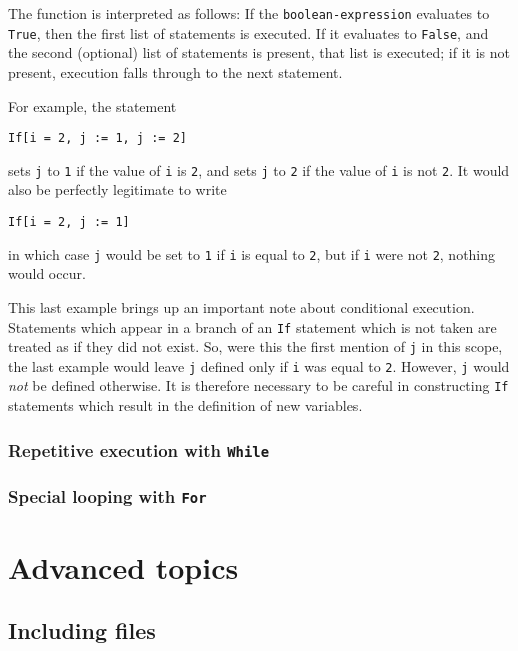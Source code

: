 \noindent The function is interpreted as follows: If the 
\verb+boolean-expression+ evaluates to \verb+True+, then the first
list of statements is executed.  If it evaluates to \verb+False+,
and the second (optional) list of statements is present, that list
is executed; if it is not present, execution falls through to the
next statement.

For example, the statement

\begin{verbatim}
If[i = 2, j := 1, j := 2]
\end{verbatim}

\noindent sets \verb+j+ to \verb+1+ if the value of \verb+i+ is \verb+2+,
and sets \verb+j+ to \verb+2+ if the value of \verb+i+ is not \verb+2+.
It would also be perfectly legitimate to write

\begin{verbatim}
If[i = 2, j := 1]
\end{verbatim}

\noindent in which case \verb+j+ would be set to \verb+1+ if \verb+i+
is equal to \verb+2+, but if \verb+i+ were not \verb+2+, nothing would
occur.

This last example brings up an important note about conditional
execution.  Statements which appear in a branch of an \verb+If+
statement which is not taken are treated as if they did not exist.
So, were this the first mention of \verb+j+ in this scope, the last
example would leave \verb+j+ defined only if \verb+i+ was equal to
\verb+2+.  However, \verb+j+ would {\em not} be defined otherwise.  It
is therefore necessary to be careful in constructing \verb+If+
statements which result in the definition of new variables.

\subsubsection{Repetitive execution with {\tt While}}

\subsubsection{Special looping with {\tt For}}


\section{Advanced topics}

\subsection{Including files}

